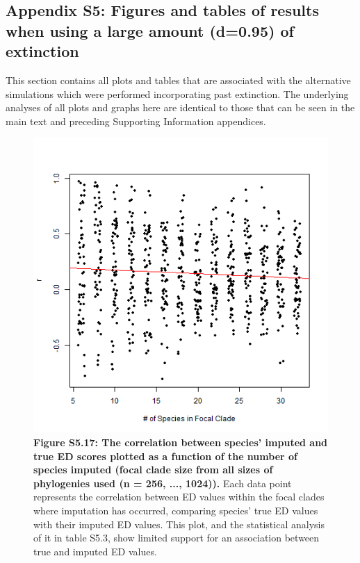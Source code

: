 \documentclass[10pt,english]{article}
\begin{document}
\clearpage
\subsection*{Appendix S5: Figures and tables of results when using a large amount (d=0.95) of extinction}

This section contains all plots and tables that are associated with the
alternative simulations which were performed incorporating past extinction. The
underlying analyses of all plots and graphs here are identical to those that can
be seen in the main text and preceding Supporting Information appendices.

\begin{figure}[!ht]
  \center
  \includegraphics[width=.5\textwidth]{../figures/edModelHighExtinction.png}
  \caption*{\textbf{Figure S5.17: The correlation between species' imputed and
      true ED scores plotted as a function of the number of species imputed
      (focal clade size from all sizes of phylogenies used (n = 256, ...,
      1024)).} Each data point represents the correlation between ED values
      within the focal clades where imputation has occurred, comparing species'
      true ED values with their imputed ED values. This plot, and the
      statistical analysis of it in table S5.3, show limited support for an
      association between true and imputed ED values.}
\end{figure}
\end{document}
